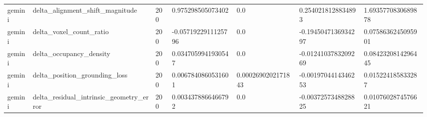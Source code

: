 \begin{tabular}{lllllll}
gemini & delta\_alignment\_shift\_magnitude & 200 & 0.975298505073402 & 0.0 & 0.2540218128834893 & 1.6935770830689878 \\
gemini & delta\_voxel\_count\_ratio & 200 & -0.0571922911125796 & 0.0 & -0.1945047136934297 & 0.0758636245095901 \\
gemini & delta\_occupancy\_density & 200 & 0.0347059941930547 & 0.0 & -0.0124103783209269 & 0.0842320814296445 \\
gemini & delta\_position\_grounding\_loss & 200 & 0.0067840860531601 & 0.0002690202171843 & -0.0019704414346253 & 0.015224185833287 \\
gemini & delta\_residual\_intrinsic\_geometry\_error & 200 & 0.0034378866466792 & 0.0 & -0.0037257348828825 & 0.0107602874576621 \\
\end{tabular}
